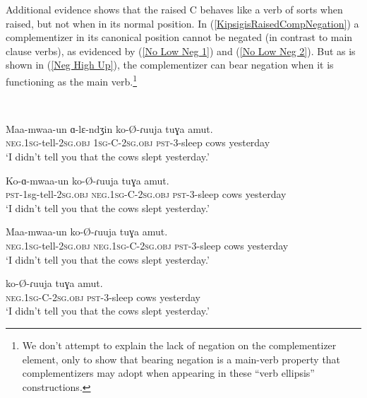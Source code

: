 Additional evidence shows that the raised C behaves like a verb of sorts when raised, but not when in its normal position. In (\ref{KipsigisRaisedCompNegation}) a complementizer in its canonical position cannot be negated (in contrast to main clause verbs), as evidenced by (\ref{No Low Neg 1}) and (\ref{No Low Neg 2}). But as is shown in (\ref{Neg High Up}), the complementizer can bear negation when it is functioning as the main verb.\footnote{We don't attempt to explain the lack of negation on the complementizer element, only to show that bearing negation is a main-verb property that complementizers may adopt when appearing in these ``verb ellipsis'' constructions.} 

\ea \label{KipsigisRaisedCompNegation}
\\
\begin{xlist}

\ex \label{Neg on Verb} 
\gll Maa-mwaa-un ɑ-lɛ-ndʒin ko-\O-ɾuuja tuɣa amut. \\
\textsc{neg}.1\textsc{sg}-tell-2\textsc{sg}.\textsc{obj} 1\textsc{sg}-C-2\textsc{sg}.\textsc{obj} \textsc{pst}-3-sleep cows yesterday \\
\glt `I didn't tell you that the cows slept yesterday.'

\ex \label{No Low Neg 1}
\gll *Ko-ɑ-mwaa-un  ko-\O-ɾuuja tuɣa amut. \\
\textsc{pst}-1sg-tell-2\textsc{sg}.\textsc{obj} \textsc{neg}.1\textsc{sg}-C-2\textsc{sg}.\textsc{obj} \textsc{pst}-3-sleep cows yesterday \\
\glt `I didn't tell you that the cows slept yesterday.'

\ex \label{No Low Neg 2}
\gll *Maa-mwaa-un  ko-\O-ɾuuja tuɣa amut. \\
\textsc{neg}.1\textsc{sg}-tell-2\textsc{sg}.\textsc{obj} \textsc{neg}.1\textsc{sg}-C-2\textsc{sg}.\textsc{obj} \textsc{pst}-3-sleep cows yesterday \\
\glt `I didn't tell you that the cows slept yesterday.'

\ex \label{Neg High Up}
\gll {} ko-\O-ɾuuja tuɣa amut. \\
\textsc{neg}.1\textsc{sg}-C-2\textsc{sg}.\textsc{obj} \textsc{pst}-3-sleep cows yesterday \\
\glt `I didn't tell you that the cows slept yesterday.'

\end{xlist} 
\z

